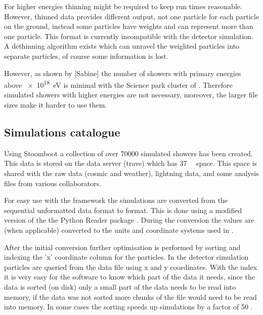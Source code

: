 For higher energies thinning might be required to keep run times
reasonable. However, thinned data provides different output, not one
particle for each particle on the ground, instead some particles have
weights and can represent more than one particle. This format is
currently incompatible with the detector simulation. A dethinning
algorithm exists \cite{stokes2012} which can unravel the weighted
particles into separate particles, of course some information is lost.

However, as shown by [Sabine] the number of showers with primary
energies above \SI{e18}{\electronvolt} is minimal with the Science park
cluster of \hisparc. Therefore simulated showers with higher energies
are not necessary, moreover, the larger file sizes make it harder to
use them.


\subsection{Simulations catalogue}

Using Stoomboot a collection of over \num{70000} simulated showers has
been created. This data is stored on the \hisparc data server (trave)
which has \SI{37}{\tera\byte} space. This space is shared with the raw
\hisparc data (cosmic and weather), \knmi lightning data, and some
analysis files from various \hisparc collaborators.

For easy use with the \sapphire framework the \corsika simulations are
converted from the sequential unformatted \fortran data format to \hdf
format. This is done using a modified version of the the Python \corsika
Reader package \cite{gonzalez2011}. During the conversion the values are
(when applicable) converted to the units and coordinate systems used in
.

After the initial conversion further optimisation is performed by
sorting and indexing the 'x' coordinate column for the particles. In the
detector simulation particles are queried from the \corsika data file
using x and y coordinates. With the index it is very easy for the
software to know which part of the data it needs, since the data is
sorted (on disk) only a small part of the data needs to be read into
memory, if the data was not sorted more chunks of the file would need to
be read into memory. In some cases the sorting speeds up simulations by
a factor of 50 \cite{pytables:optimization}.


